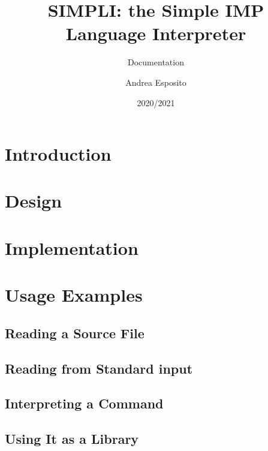 \documentclass{esposito-documentation}
\title{SIMPLI: the Simple IMP Language Interpreter}
\subtitle{Documentation}
\author{Andrea Esposito}
\date{2020/2021}
\begin{document}
\frontmatter
\maketitle
\colophon
\tableofcontents

\mainmatter
\chapter{Introduction}

\chapter{Design}

\chapter{Implementation}

\chapter{Usage Examples}

\section{Reading a Source File}

\section{Reading from Standard input}

\section{Interpreting a Command}

\section{Using It as a Library}
\end{document}
